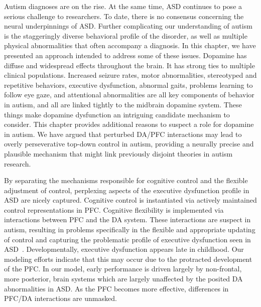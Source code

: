%
%

Autism diagnoses are on the rise. At the same time, ASD continues to pose a serious challenge to researchers. To date, there is no consensus concerning the neural underpinnings of ASD. Further complicating our understanding of autism is the staggeringly diverse behavioral profile of the disorder, as well as multiple physical abnormalities that often accompany a diagnosis. In this chapter, we have presented an approach intended to address some of these issues. Dopamine has diffuse and widespread effects throughout the brain. It has strong ties to multiple clinical populations. Increased seizure rates, motor abnormalities, stereotyped and repetitive behaviors, executive dysfunction, abnormal gaits, problems learning to follow eye gaze, and attentional abnormalities are all key components of behavior in autism, and all are linked tightly to the midbrain dopamine system. These things make dopamine dysfunction an intriguing candidate mechanism to consider. This chapter provides additional reasons to suspect a role for dopamine in autism. We have argued that perturbed DA/PFC interactions may lead to overly perseverative top-down control in autism, providing a neurally precise and plausible mechanism that might link previously disjoint theories in autism research. 

By separating the mechanisms responsible for cognitive control and the flexible adjustment of control, perplexing aspects of the executive dysfunction profile in ASD are nicely captured. Cognitive control is instantiated via actively maintained control representations in PFC. Cognitive flexibility is implemented via interactions between PFC and the DA system. These interactions are suspect in autism, resulting in problems specifically in the flexible and appropriate updating of control and capturing the problematic profile of executive dysfunction seen in ASD~\cite{HillEL:2004:AutismExecutiveDysfunction}. Developmentally, executive dysfunction appears late in childhood. Our modeling efforts indicate that this may occur due to the protracted development of the PFC. In our model, early performance is driven largely by non-frontal, more posterior, brain systems which are largely unaffected by the posited DA abnormalities in ASD. As the PFC becomes more effective, differences in PFC/DA interactions are unmasked.  



